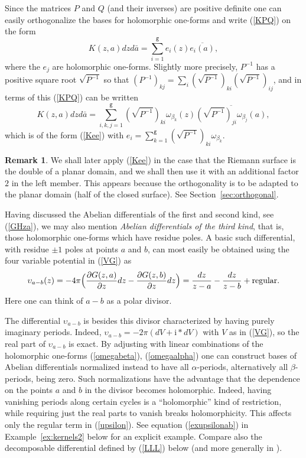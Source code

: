 \documentclass[reqno,12pt]{article}
\theoremstyle{plain}
\theoremstyle{definition}
\newtheorem{remark}[defn]{Remark}
\numberwithin{equation}{section}
\numberwithin{figure}{section}
\def\I{\mathrm{i}}
\begin{document}
Since the matrices $P$ and $Q$ (and their inverses)
are positive definite one can easily orthogonalize the bases for holomorphic one-forms
and write (\ref{KPQ}) on the form
\begin{equation}\label{Kee}
K(z,a)dz  d\bar{a}=\sum_{i=1}^\texttt{g} e_i(z) \overline{e_i(a)},
\end{equation}
where the $e_j$ are holomorphic one-forms. Slightly more precisely, $P^{-1}$
has a positive square root $\sqrt{P^{-1}}$ so that
$(P^{-1})_{kj}=\sum_i (\sqrt{P^{-1}})_{ki}(\sqrt{P^{-1}})_{ij}$, and in terms of this (\ref{KPQ})
can be written
$$
K(z,a)dzd\bar{a}
=\sum_{i,k,j=1}^\texttt{g} (\sqrt{P^{-1}})_{ki}\omega_{\beta_k}(z)\overline{(\sqrt{P^{-1}})_{ji}\omega_{\beta_j}(a)},
$$
which is of the form (\ref{Kee}) with $e_i=\sum_{k=1}^\texttt{g}(\sqrt{P^{-1}})_{ki}\omega_{\beta_k}$.

\begin{remark}
We shall later apply (\ref{Kee}) in the case that the Riemann surface is the double of a planar domain,
and we shall then use it with an additional factor $2$ in the left member. This appears because the
orthogonality is to be adapted to the planar domain (half of the closed surface). See Section~\ref{sec:orthogonal}.
\end{remark}
 
Having discussed the Abelian differentials of the first and second kind, 
see (\ref{GHza}), we may also
mention {\it Abelian differentials of the third kind}, that is, those holomorphic one-forms
which have residue poles. A basic such differential, with residue $\pm 1$ poles at points $a$ and $b$, 
can most easily be obtained using the four variable potential in (\ref{VG}) as
\begin{equation}\label{upsilon}
\upsilon_{a-b}(z)=-{4\pi}\Big(\frac{\partial G(z,a)}{\partial z}dz-\frac{\partial G(z,b)}{\partial z}dz\Big)
=\frac{dz}{z-a}-\frac{dz}{z-b}+{\rm regular}.
\end{equation}
Here one can think of $a-b$ as a polar divisor.  

The differential $\upsilon_{a-b}$ is besides this divisor
characterized by having purely imaginary periods. Indeed,
$\upsilon_{a-b}= -2\pi (dV+\I *dV)$ with $V$ as in (\ref{VG}), so the real part of $\upsilon_{a-b}$ is exact.
By adjusting with linear combinations of the holomorphic
one-forms (\ref{omegabeta}), (\ref{omegaalpha}) one can construct bases of Abelian differentials normalized 
instead to have all $\alpha$-periods, alternatively all $\beta$-periods, being zero. Such normalizations have
the advantage that the dependence on the points $a$ and $b$ in the divisor becomes holomorphic. 
Indeed, having vanishing periods along certain cycles is a ``holomorphic'' kind of restriction, while requiring
just the real parts to vanish breaks holomorphicity. This affects only the regular term in (\ref{upsilon}).
See equation (\ref{exupsilonab}) in Example~\ref{ex:kernels2} below for an explicit example. Compare also
the decomposable differential defined by (\ref{LLL}) below (and more generally in \cite{Hawley-Schiffer-1966}).
\end{document}
